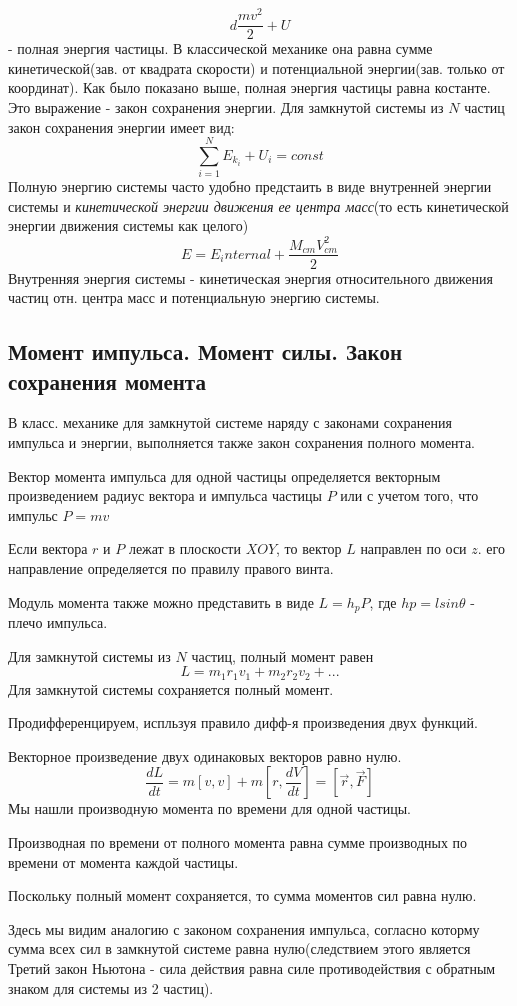\documentclass{article}
\begin{document}
$$d\frac{mv^2}{2}+U$$ - полная энергия частицы. В классической механике она равна сумме кинетической(зав. от квадрата скорости) и потенциальной энергии(зав. только от координат).
Как было показано выше, полная энергия частицы равна костанте. Это выражение - закон сохранения энергии.
Для замкнутой системы из $N$ частиц закон сохранения энергии имеет вид:
$$\sum_{i=1}^N E_{k_i}+U_i = const$$
Полную энергию системы часто удобно предстаить в виде внутренней энергии системы и \emph{кинетической энергии движения ее центра масс}(то есть кинетической энергии движения системы как целого)
$$E = E_internal + \frac{M_{cm}V_{cm}^2}{2}$$
Внутренняя энергия системы - кинетическая энергия относительного движения частиц отн. центра масс и потенциальную энергию системы.

\subsection{Момент импульса. Момент силы. Закон сохранения момента}

В класс. механике для замкнутой системе наряду с законами сохранения импульса и энергии, выполняется также закон сохранения полного момента. 

Вектор момента импульса для одной частицы определяется векторным произведением радиус вектора и импульса частицы $P$ или с учетом того, что импульс $P=mv$

Если вектора $r$ и $P$ лежат в плоскости $XOY$, то вектор $L$ направлен по оси $z$. его направление определяется по правилу правого винта.

Модуль момента также можно представить в виде $L =h_pP$, где $hp = lsin\theta$ - плечо импульса.

Для замкнутой системы из  $N$ частиц, полный момент равен $$L = m_1r_1v_1 + m_2r_2v_2 + ...$$
Для замкнутой системы сохраняется полный момент. 

Продифференцируем, испльзуя правило дифф-я произведения двух функций.

Векторное произведение двух одинаковых векторов равно нулю. 
$$\frac{dL}{dt} = m[v,v] + m[r, \frac{dV}{dt}] = [\vec r, \vec F]$$
Мы нашли производную момента по времени для одной частицы. 

Производная по времени от полного момента равна сумме производных по времени от момента каждой частицы.

Поскольку полный момент сохраняется, то сумма моментов сил равна нулю.

Здесь мы видим аналогию с законом сохранения импульса, согласно которму сумма всех сил в замкнутой системе равна нулю(следствием этого является Третий закон Ньютона - сила действия равна силе противодействия с обратным знаком для системы из 2 частиц).
\end{document}
